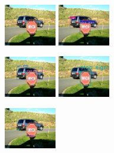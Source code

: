 \documentclass[letterpaper]{article}
\begin{document}
\begin{figure}[bhpt]
    \begin{subfigure}{0.93\textwidth}
        \includegraphics[width = 0.25\textwidth, height = 0.3\textwidth]{Images/yolo_det_test3.jpg} 
        \includegraphics[width = 0.25\textwidth,  height = 0.3\textwidth]{Images/yolo_det_att.jpg}
    \end{subfigure}
    \begin{subfigure}{0.93\textwidth}
        \includegraphics[width = 0.25\textwidth, height = 0.3\textwidth]{Images/FRCNN_Box_test3.jpg}
        \includegraphics[width = 0.25\textwidth, height = 0.3\textwidth]{Images/FRCNN_Box_att_test3.jpg}
    \end{subfigure}
    \begin{subfigure}{0.93\textwidth}
        \includegraphics[width = 0.25\textwidth, height = 0.3\textwidth]{Images/ssd_test3.jpg}

\end{subfigure}
\end{figure}
\end{document}
